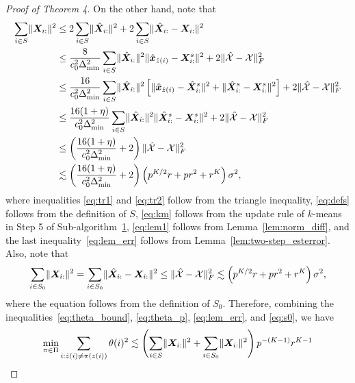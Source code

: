 \documentclass[lettersize,onecolumn,journal]{IEEEtran}
\theoremstyle{definition}
\theoremstyle{definition}
\newcommand{\of}[1]{\left(#1\right)}
\newcommand{\off}[1]{\left[#1\right]}
\begin{document}
\begin{proof}[Proof of Theorem 4]
    On the other hand, note that 
    \begin{align}
         \sum_{i \in S} \onormSize{}{\mX_{i:}}^2 & \leq 2 \sum_{i \in S} \onormSize{}{\hat \mX_{i:}}^2  +  2\sum_{i \in S} \onormSize{}{\hat \mX_{i:} - \mX_{i:}}^2 \label{eq:tr1}\\
         & \leq \frac{8}{c_0^2 \Delta_{\min}^2  } \sum_{i \in S} \onormSize{}{\hat \mX_{i:}}^2   \onormSize{}{\hat \mx_{\hat z(i)} - \mX_{i:}^s }^2 +2 \onormSize{}{\hat \tX - \tX}_F^2 \label{eq:defs} \\
         & \leq \frac{16}{c_0^2 \Delta_{\min}^2  }\sum_{i \in S} \onormSize{}{\hat \mX_{i:}}^2  \off{ \onormSize{}{\hat \mx_{\hat z(i)} - \hat \mX_{i:}^s }^2 + \onormSize{}{\hat \mX_{i:}^s - \mX_{i:}^s }^2 } + 2\onormSize{}{\hat \tX - \tX}_F^2 \label{eq:tr2} \\
         & \leq  \frac{16(1 + \eta)}{c_0^2 \Delta_{\min}^2 }\sum_{i \in S} \onormSize{}{\hat \mX_{i:}}^2  \onormSize{}{\hat \mX_{i:}^s - \mX_{i:}^s }^2  + 2\onormSize{}{\hat \tX - \tX}_F^2 \label{eq:km} \\
         & \leq \of{ \frac{16(1 + \eta)}{c_0^2 \Delta_{\min}^2 } + 2 }\onormSize{}{\hat \tX - \tX}_F^2 \label{eq:lem1}\\
         & \lesssim \of{ \frac{16(1 + \eta)}{c_0^2 \Delta_{\min}^2 } + 2 } \of{ p^{K/2}r + pr^2 + r^K } \sigma^2 \label{eq:lem_err},
    \end{align}
    where inequalities \eqref{eq:tr1} and \eqref{eq:tr2} follow from the triangle inequality, \eqref{eq:defs} follows from the definition of $S$, \eqref{eq:km} follows from the update rule of $k$-means in Step 5 of Sub-algorithm~\hyperref[alg:main]{1}, \eqref{eq:lem1} follows from Lemma~\ref{lem:norm_diff}, and the last inequality~\eqref{eq:lem_err} follows from Lemma~\ref{lem:two-step_esterror}. Also, note that 
    \begin{equation}\label{eq:s0}
         \sum_{i \in S_0} \onormSize{}{\mX_{i:}}^2 =  \sum_{i \in S_0} \onormSize{}{\hat \mX_{i:}- \mX_{i:}}^2 \leq \onormSize{}{\hat \tX - \tX}_F^2 \lesssim \of{ p^{K/2}r + pr^2 + r^K } \sigma^2,
    \end{equation}
    where the equation follows from the definition of $S_0$. Therefore, combining the inequalities~\eqref{eq:theta_bound}, \eqref{eq:theta_p}, \eqref{eq:lem_err}, and \eqref{eq:s0}, we have 
    \begin{align}
        \min_{\pi \in \Pi} \sum_{i : \hat z(i) \neq \pi(z(i))} \theta(i)^2  &\lesssim \of{\sum_{i \in S} \onormSize{}{\mX_{i:}}^2 + \sum_{i \in S_0} \onormSize{}{\mX_{i:}}^2  } p^{-(K-1)} r^{K-1} \\

\end{align}
\end{proof}
\end{document}
